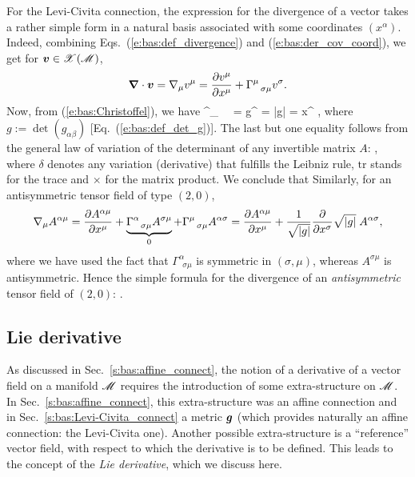 For the Levi-Civita connection, the expression for the divergence of a vector takes
a rather simple form in a natural basis associated with some coordinates $(x^\alpha)$.
Indeed, combining Eqs.~(\ref{e:bas:def_divergence}) and (\ref{e:bas:der_cov_coord}),
we get for $\bm{v}\in\mathscr{X}(\mathscr{M})$,
\[
  \bm{\nabla}\cdot\bm{v} = \nabla_\mu v^\mu = \frac{\partial v^\mu}{\partial x^\mu} + \Gamma^\mu_{\ \ \sigma\mu} v^\sigma   .
\]
Now, from (\ref{e:bas:Christoffel}),  we have
\be \label{e:bas:trGam_det_g}
  \Gamma^\mu_{\ \ \alpha\mu} =   g^{\mu\nu} 
  =   \ln|g|
  = \der{} {x^\alpha}  ,
\ee
where $g := \det(g_{\alpha\beta})$ [Eq.~(\ref{e:bas:def_det_g})].
The last but one equality follows from the general law of variation of the determinant of any
invertible matrix $A$:
\be \label{e:bas:variation_det}
     ,
\ee
where $\delta$ denotes any variation (derivative) that fulfills the Leibniz rule,
$\mathrm{tr}$ stands for the trace and $\times$ for the matrix product.
We conclude that
\be \label{e:bas:div_vect}
\ee
Similarly, for an antisymmetric tensor field of type $(2,0)$,
\[
   \nabla_\mu A^{\alpha\mu}
  = \frac{\partial A^{\alpha\mu}}{\partial x^\mu} +
  \underbrace{\Gamma^\alpha_{\ \ \sigma\mu} A^{\sigma\mu}}_{0}
  + \Gamma^\mu_{\ \ \sigma\mu} A^{\alpha\sigma}
  = \frac{\partial A^{\alpha\mu}}{\partial x^\mu} +  \frac{1}{\sqrt{|g|}}\frac{\partial }{\partial x^\sigma} \sqrt{|g|}
  \;  A^{\alpha\sigma} ,
\]
where we have used the fact that $\Gamma^\alpha_{\ \ \sigma\mu}$ is symmetric in
$(\sigma,\mu)$, whereas $A^{\sigma\mu}$ is antisymmetric.
Hence the simple formula for the divergence of an \emph{antisymmetric} tensor field
of $(2,0)$:
\be \label{e:bas:div_antisym}
   .
\ee


\subsection{Lie derivative} \label{s:bas:Lie}

As discussed in Sec.~\ref{s:bas:affine_connect}, the notion of a derivative of a vector field on a manifold $\mathscr{M}$
requires the introduction of some extra-structure on $\mathscr{M}$.
In Sec.~\ref{s:bas:affine_connect}, this extra-structure was an affine connection
and in Sec.~\ref{s:bas:Levi-Civita_connect} a metric
$\bm{g}$ (which provides naturally an affine connection: the Levi-Civita one).
Another possible extra-structure is a ``reference''
vector field, with respect to which the derivative is to be defined. This leads to the
concept of the \emph{Lie derivative}, which we discuss here.


